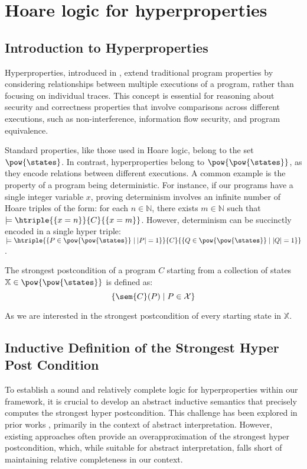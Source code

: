 \section{Hoare logic for hyperproperties}

\renewcommand{\chi}{\mathbb{X}}

\subsection{Introduction to Hyperproperties} \label{chp:hyper}

Hyperproperties, introduced in \cite{Clarkson08}, extend traditional program
properties by considering relationships between multiple executions of a
program, rather than focusing on individual traces. This concept is essential
for reasoning about security and correctness properties that involve
comparisons across different executions, such as non-interference, information
flow security, and program equivalence.

Standard properties, like those used in Hoare logic, belong to the set
$\pow{\states}$. In contrast, hyperproperties belong to $\pow{\pow{\states}}$,
as they encode relations between different executions. A common example is the
property of a program being deterministic. For instance, if our programs have a
single integer variable \(x\), proving determinism involves an infinite number
of Hoare triples of the form: for each \(n \in \mathbb{N}\), there exists \(m
\in \mathbb{N}\) such that $\models \htriple{\{ x = n \}}{C}{\{ x = m \}}$.
However, determinism can be succinctly encoded in a single hyper triple:
$\models \htriple{\{ P \in \pow{\pow{\states}} \mid |P| = 1 \}}{C}{\{ Q \in
\pow{\pow{\states}} \mid |Q| = 1 \}}$.

\begin{definition} 
  The strongest postcondition of a program \(C\) starting from a collection of 
  states \(\chi \in \pow{\pow{\states}}\) is defined as: $$\{ \sem{C}(P) \mid P 
  \in \mathcal{X} \}$$
\end{definition}

As we are interested in the strongest postcondition of every starting state in
$\chi$.

\subsection{Inductive Definition of the Strongest Hyper Post Condition}

To establish a sound and relatively complete logic for hyperproperties within
our framework, it is crucial to develop an abstract inductive semantics that
precisely computes the strongest hyper postcondition. This challenge has been
explored in prior works \cite{Mounir17, Mastroeni18}, primarily in the context
of abstract interpretation. However, existing approaches often provide an
overapproximation of the strongest hyper postcondition, which, while suitable
for abstract interpretation, falls short of maintaining relative completeness
in our context.

